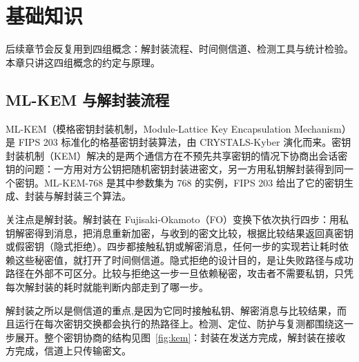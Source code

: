 
\usetikzlibrary{positioning}

\section{基础知识}

后续章节会反复用到四组概念：解封装流程、时间侧信道、检测工具与统计检验。本章只讲这四组概念的约定与原理。

\subsection{ML-KEM 与解封装流程}

ML-KEM（模格密钥封装机制，Module-Lattice Key Encapsulation Mechanism）是 FIPS 203 标准化的格基密钥封装算法，由 CRYSTALS-Kyber 演化而来。密钥封装机制（KEM）解决的是两个通信方在不预先共享密钥的情况下协商出会话密钥的问题：一方用对方公钥把随机密钥封装进密文，另一方用私钥解封装得到同一个密钥。ML-KEM-768 是其中参数集为 768 的实例，FIPS 203 给出了它的密钥生成、封装与解封装三个算法。

关注点是解封装。解封装在 Fujisaki-Okamoto（FO）变换下依次执行四步：用私钥解密得到消息，把消息重新加密，与收到的密文比较，根据比较结果返回真密钥或假密钥（隐式拒绝）。四步都接触私钥或解密消息，任何一步的实现若让耗时依赖这些秘密值，就打开了时间侧信道。隐式拒绝的设计目的，是让失败路径与成功路径在外部不可区分。比较与拒绝这一步一旦依赖秘密，攻击者不需要私钥，只凭每次解封装的耗时就能判断内部走到了哪一步。

解封装之所以是侧信道的重点,是因为它同时接触私钥、解密消息与比较结果，而且运行在每次密钥交换都会执行的热路径上。检测、定位、防护与复测都围绕这一步展开。整个密钥协商的结构见图~\ref{fig:kem}：封装在发送方完成，解封装在接收方完成，信道上只传输密文。

